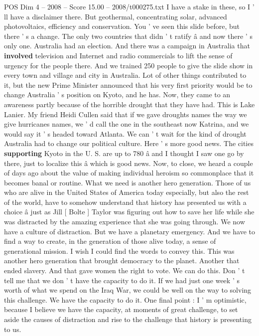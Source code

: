 \begin{textsample}{POS Dim 4 – 2008 – Score 15.00 – 2008/t000275.txt}
I have a stake in these, so I ' ll have a disclaimer there.
But geothermal, concentrating solar, advanced photovoltaics, efficiency and conservation.
You ' ve seen this slide before, but there ' s a change.
The only two countries that didn ' t ratify â and now there ' s only one.
Australia had an election.
And there was a campaign in Australia that \textbf{involved} television and Internet and radio commercials to lift the sense of urgency for the people there.
And we trained 250 people to give the slide show in every town and village and city in Australia.
Lot of other things contributed to it, but the new Prime Minister announced that his very first priority would be to change Australia ' s position on Kyoto, and he has.
Now, they came to an awareness partly because of the horrible drought that they have had.
This is Lake Lanier.
My friend Heidi Cullen said that if we gave droughts names the way we give hurricanes names, we ' d call the one in the southeast now Katrina, and we would say it ' s headed toward Atlanta.
We can ' t wait for the kind of drought Australia had to change our political culture.
Here ' s more good news.
The cities \textbf{supporting} Kyoto in the U.
S. are up to 780 â and I thought I saw one go by there, just to localize this â which is good news.
Now, to close, we heard a couple of days ago about the value of making individual heroism so commonplace that it becomes banal or routine.
What we need is another hero generation.
Those of us who are alive in the United States of America today especially, but also the rest of the world, have to somehow understand that history has presented us with a choice â just as Jill [ Bolte ] Taylor was figuring out how to save her life while she was distracted by the amazing experience that she was going through.
We now have a culture of distraction.
But we have a planetary emergency.
And we have to find a way to create, in the generation of those alive today, a sense of generational mission.
I wish I could find the words to convey this.
This was another hero generation that brought democracy to the planet.
Another that ended slavery.
And that gave women the right to vote.
We can do this.
Don ' t tell me that we don ' t have the capacity to do it.
If we had just one week ' s worth of what we spend on the Iraq War, we could be well on the way to solving this challenge.
We have the capacity to do it.
One final point : I ' m optimistic, because I believe we have the capacity, at moments of great challenge, to set aside the causes of distraction and rise to the challenge that history is presenting to us.

\end{textsample}
